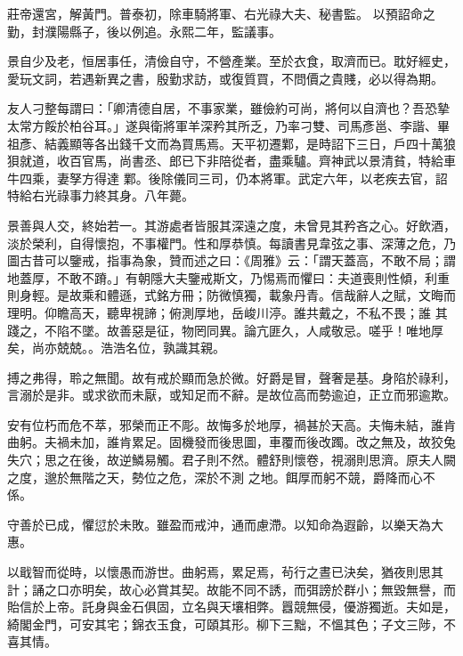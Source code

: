 \begin{pinyinscope}
 莊帝還宮，解黃門。普泰初，除車騎將軍、右光祿大夫、秘書監。
 以預詔命之勤，封濮陽縣子，後以例追。永熙二年，監議事。



 景自少及老，恒居事任，清儉自守，不營產業。至於衣食，取濟而已。耽好經史，愛玩文詞，若遇新異之書，殷勤求訪，或復質買，不問價之貴賤，必以得為期。



 友人刁整每謂曰：「卿清德自居，不事家業，雖儉約可尚，將何以自濟也？吾恐摯太常方餒於柏谷耳。」遂與衛將軍羊深矜其所乏，乃率刁雙、司馬彥邕、李諧、畢祖彥、結義顯等各出錢千文而為買馬焉。天平初遷鄴，是時詔下三日，戶四十萬狼狽就道，收百官馬，尚書丞、郎已下非陪從者，盡乘驢。齊神武以景清貧，特給車牛四乘，妻孥方得達
 鄴。後除儀同三司，仍本將軍。武定六年，以老疾去官，詔特給右光祿事力終其身。八年薨。



 景善與人交，終始若一。其游處者皆服其深遠之度，未曾見其矜吝之心。好飲酒，淡於榮利，自得懷抱，不事權門。性和厚恭慎。每讀書見韋弦之事、深薄之危，乃圖古昔可以鑒戒，指事為象，贊而述之曰：《周雅》云：「謂天蓋高，不敢不局；謂地蓋厚，不敢不蹐。」有朝隱大夫鑒戒斯文，乃惕焉而懼曰：夫道喪則性傾，利重則身輕。是故乘和體遜，式銘方冊；防微慎獨，載象丹青。信哉辭人之賦，文晦而理明。仰瞻高天，聽卑視諦；俯測厚地，岳峻川渟。誰共戴之，不私不畏；誰
 其踐之，不陷不墜。故善惡是征，物罔同異。論亢匪久，人咸敬忌。嗟乎！唯地厚矣，尚亦兢兢。。浩浩名位，孰識其親。



 搏之弗得，聆之無聞。故有戒於顯而急於微。好爵是冒，聲奢是基。身陷於祿利，言溺於是非。或求欲而未厭，或知足而不辭。是故位高而勢逾迫，正立而邪逾欺。



 安有位朽而危不萃，邪榮而正不彫。故悔多於地厚，禍甚於天高。夫悔未結，誰肯曲躬。夫禍未加，誰肯累足。固機發而後思圖，車覆而後改躅。改之無及，故狡兔失穴；思之在後，故逆鱗易觸。君子則不然。體舒則懷卷，視溺則思濟。原夫人闕之度，邈於無階之天，勢位之危，深於不測
 之地。餌厚而躬不競，爵降而心不係。



 守善於已成，懼愆於未敗。雖盈而戒沖，通而慮滯。以知命為遐齡，以樂天為大惠。



 以戢智而從時，以懷愚而游世。曲躬焉，累足焉，茍行之晝已決矣，猶夜則思其計；誦之口亦明矣，故心必賞其契。故能不同不誘，而弭謗於群小；無毀無譽，而貽信於上帝。託身與金石俱固，立名與天壤相弊。囂競無侵，優游獨逝。夫如是，綺閣金門，可安其宅；錦衣玉食，可頤其形。柳下三黜，不慍其色；子文三陟，不喜其情。




\end{pinyinscope}
